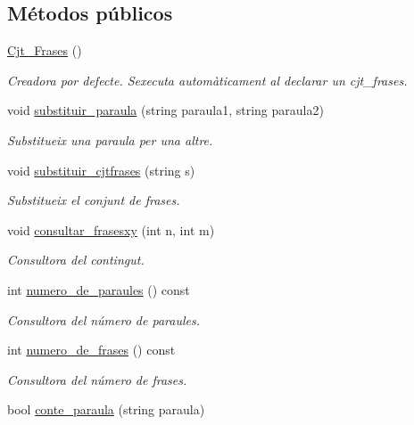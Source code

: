 \subsection*{Métodos públicos}
\begin{DoxyCompactItemize}
\item 
\hyperlink{class_cjt___frases_a31e716c9505cf3b9cc5add72c11f44ea}{Cjt\+\_\+\+Frases} ()
\begin{DoxyCompactList}\small\item\em Creadora por defecte. S\textquotesingle{}executa automàticament al declarar un cjt\+\_\+frases. \end{DoxyCompactList}\item 
void \hyperlink{class_cjt___frases_a2f71744b91a5d9c6077fb3e0f05048bb}{substituir\+\_\+paraula} (string paraula1, string paraula2)
\begin{DoxyCompactList}\small\item\em Substitueix una paraula per una altre. \end{DoxyCompactList}\item 
void \hyperlink{class_cjt___frases_ab61657ab1517fc6d640a80f8b54e8b83}{substituir\+\_\+cjtfrases} (string s)
\begin{DoxyCompactList}\small\item\em Substitueix el conjunt de frases. \end{DoxyCompactList}\item 
void \hyperlink{class_cjt___frases_ab3f2ab417040813df6d3dee8350559d3}{consultar\+\_\+frasesxy} (int n, int m)
\begin{DoxyCompactList}\small\item\em Consultora del contingut. \end{DoxyCompactList}\item 
int \hyperlink{class_cjt___frases_a42ba9f0a302235d52ca4063dd9ef2145}{numero\+\_\+de\+\_\+paraules} () const 
\begin{DoxyCompactList}\small\item\em Consultora del número de paraules. \end{DoxyCompactList}\item 
int \hyperlink{class_cjt___frases_aaf9ad179f28ad0b4e782510c345e0cca}{numero\+\_\+de\+\_\+frases} () const 
\begin{DoxyCompactList}\small\item\em Consultora del número de frases. \end{DoxyCompactList}\item 
bool \hyperlink{class_cjt___frases_a6e45b67d225ed403aa0ce791d3bed726}{conte\+\_\+paraula} (string paraula)

\end{DoxyCompactItemize}
